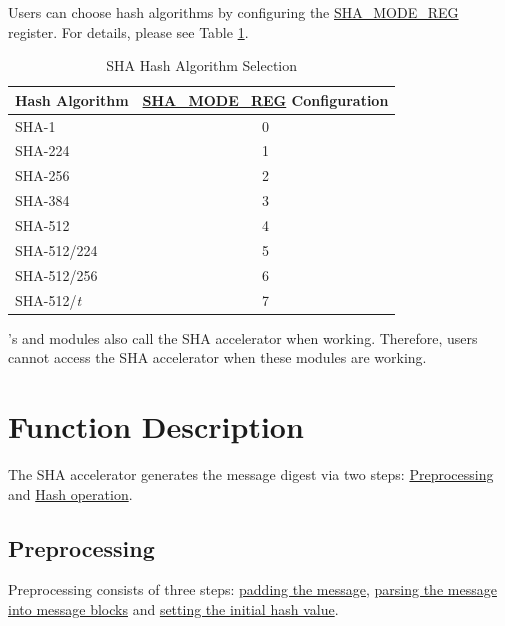 \documentclass[main\_\_EN.tex]{subfiles}
\begin{document}
Users can choose hash algorithms by configuring the \hyperref[regdesc:SHAMODEREG]{SHA\_MODE\_REG} register. For details, please see Table \ref{tab:sha-mode-summ}.

\begin{longtable}[c]{| l | c |}
\caption{SHA Hash Algorithm Selection}
\label{tab:sha-mode-summ}
\\\hline
\rowcolor{lightgray}
\textbf{Hash Algorithm} & \textbf{\hyperref[regdesc:SHAMODEREG]{SHA\_MODE\_REG} Configuration}\\\hline
    SHA-1               & 0 \\\hline
    SHA-224             & 1 \\\hline
    SHA-256             & 2 \\\hline
    SHA-384             & 3 \\\hline
    SHA-512             & 4 \\\hline
    SHA-512/224         & 5 \\\hline
    SHA-512/256         & 6 \\\hline
    SHA-512/{\it{t}}    & 7 \\\hline
\end{longtable}


\begin{importantlisting}
\vspace{-0.5em}

    \chipname{}'s  and  modules also call the SHA accelerator when working. Therefore, users cannot access the SHA accelerator when these modules are working.
\end{importantlisting}

\section{Function Description}

The SHA accelerator generates the message digest via two steps: \hyperref[sec:sha-preprocessing]{Preprocessing} and  \hyperref[sec:sha-hash-operation]{Hash operation}.

\subsection{Preprocessing}\label{sec:sha-preprocessing}

Preprocessing consists of three steps: \hyperref[sec:sha-text-padding]{padding the message}, \hyperref[sec:sha-parsing-message]{parsing the message into message blocks} and \hyperref[sec:sha-initial-hash]{setting the initial hash value}.
\end{document}
